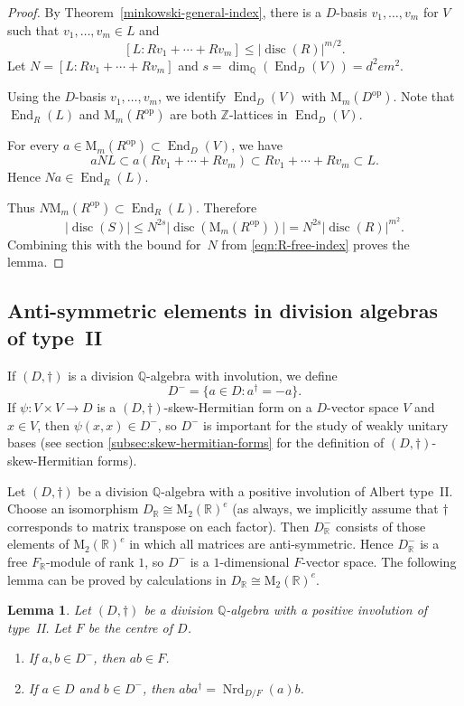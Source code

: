 \documentclass[11pt]{article}
\numberwithin{equation}{section}
\newenvironment{enumeratei}
{\bgroup\def\theenumi{\roman{enumi}}\def\theenumii{\alph{enumii}}\begin{enumerate}}
{\end{enumerate}\egroup}
\newcommand{\bQ}{\mathbb{Q}}
\newcommand{\bR}{\mathbb{R}}
\newcommand{\bZ}{\mathbb{Z}}
\newcommand{\rM}{\mathrm{M}}
\DeclareMathOperator{\disc}{disc}
\DeclareMathOperator{\End}{End}
\DeclareMathOperator{\Nrd}{Nrd}
\newcommand{\op}{\mathrm{op}}
\newcommand{\abs}[1]{\lvert #1 \rvert}
\newtheorem{lemma}{Lemma}[section]
\begin{document}
\begin{proof}
By Theorem~\ref{minkowski-general-index}, there
is a $D$-basis $v_1, \dotsc, v_m$ for $V$ such that \hbox{$v_1, \dotsc, v_m \!\in\! L$} and
\begin{equation} \label{eqn:R-free-index}
[L:Rv_1 + \dotsb + Rv_m] \leq \abs{\disc(R)}^{m/2}.
\end{equation}
Let $N = [L:Rv_1 + \dotsb + Rv_m]$ and $s = \dim_\bQ(\End_D(V)) = d^2em^2$.

Using the $D$-basis $v_1, \dotsc, v_m$, we identify $\End_D(V)$ with $\rM_m(D^\op)$.
Note that $\End_R(L)$ and $\rM_m(R^\op)$ are both $\bZ$-lattices in $\End_D(V)$.

For every $a \in \rM_m(R^\op) \subset \End_D(V)$, we have
\[
aNL \subset a(Rv_1 + \dotsb + Rv_m) \subset Rv_1 + \dotsb + Rv_m \subset L.
\]
Hence $Na \in \End_R(L)$.

Thus $N\rM_m(R^\op) \subset \End_R(L)$.
Therefore
\[
\abs{\disc(S)} \leq N^{2s} \abs{\disc(\rM_m(R^\op))}
= N^{2s} \abs{\disc(R)}^{m^2}.
\]
Combining this with the bound for~$N$ from \eqref{eqn:R-free-index} proves the lemma.
\end{proof}

\subsection{Anti-symmetric elements in division algebras of type~II}

If $(D, \dag)$ is a division $\bQ$-algebra with involution, we define
\[
D^- = \{ a \in D : a^\dag = -a \}.
\]
If $\psi \colon V \times V \to D$ is a $(D,\dag)$-skew-Hermitian form on a $D$-vector space $V$ and $x \in V$, then $\psi(x,x) \in D^-$, so $D^-$ is important for the study of weakly unitary bases (see section \ref{subsec:skew-hermitian-forms} for the definition of $(D,\dag)$-skew-Hermitian forms).

Let $(D,\dag)$ be a division $\bQ$-algebra with a positive involution of Albert type~II.
Choose an isomorphism $D_\bR \cong \rM_2(\bR)^e$ (as always, we implicitly assume that $\dag$ corresponds to matrix transpose on each factor).
Then $D_\bR^-$ consists of those elements of $\rM_2(\bR)^e$ in which all matrices are anti-symmetric.
Hence $D_\bR^-$ is a free $F_\bR$-module of rank $1$, so $D^-$ is a $1$-dimensional $F$-vector space. The following lemma can be proved by calculations in $D_\bR \cong \rM_2(\bR)^e$.

\begin{lemma} \label{action-on-antisymm}
Let $(D, \dag)$ be a division $\bQ$-algebra with a positive involution of type~II.
Let $F$ be the centre of $D$.
\begin{enumeratei}
\item\label{action-on-antisymmi} If $a, b \in D^-$, then $ab \in F$.
\item\label{action-on-antisymmii} If $a \in D$ and $b \in D^-$, then $aba^\dag = \Nrd_{D/F}(a)b$.
\end{enumeratei}
\end{lemma}
\end{document}
